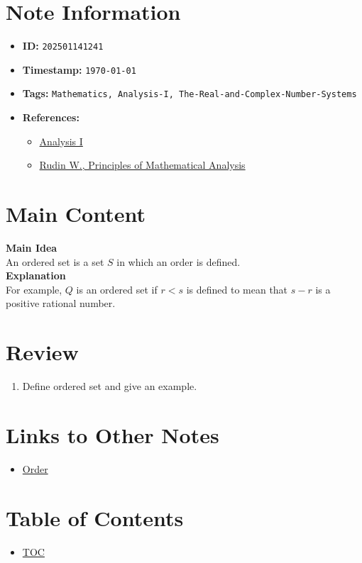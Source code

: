 \clearpage
{}
\label{202501141241}
\renewcommand{\notetitle}{Ordered Set}

\section*{Note Information}
\begin{itemize}
  \item \textbf{ID:} \texttt{202501141241}
  \item \textbf{Timestamp:} \texttt{\today \ \currenttime}
  \item \textbf{Tags:} \texttt{Mathematics, Analysis-I, The-Real-and-Complex-Number-Systems}
  \item \textbf{References:}
    \begin{itemize}
      \item \href{https://ocw.mit.edu/courses/18-100b-analysis-i-fall-2010/}{Analysis I}
      \item \href{/home/garrett/Personal/References/Mathematics/Analysis-I/Rudin.pdf}{Rudin W., Principles of Mathematical Analysis}
    \end{itemize}
\end{itemize}


\section*{Main Content}
\textbf{Main Idea}\\
An ordered set is a set $S$ in which an order is defined.\\

\textbf{Explanation}\\
For example, $Q$ is an ordered set if $r < s$ is defined to mean that $s-r$ is a positive rational number.\\

\section*{Review}
\begin{enumerate}
  \item Define ordered set and give an example.
\end{enumerate}


\section*{Links to Other Notes}
\begin{itemize}
  \item \hyperref[202501141228]{Order}
\end{itemize}

\section*{Table of Contents}

\begin{itemize}
  \item \hyperref[toc]{TOC}
\end{itemize}

